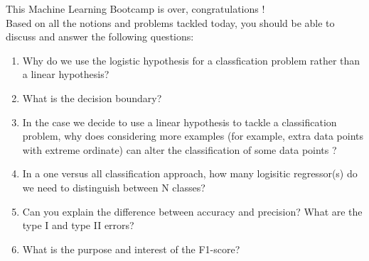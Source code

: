 \documentclass{42-en}
\begin{document}
This Machine Learning Bootcamp is over, congratulations !\\
\newline
Based on all the notions and problems
tackled today, you should be able to discuss and answer the following questions:
\begin{enumerate}
  \item Why do we use the logistic hypothesis for a classfication problem rather than a linear hypothesis?
  \item What is the decision boundary?
  \item In the case we decide to use a linear hypothesis to tackle a classification problem, why does considering more examples
   (for example, extra data points with extreme ordinate) can alter the classification of some data points ?  
  \item In a one versus all classification approach, how many logisitic regressor(s) do we need to distinguish between N classes?
  \item Can you explain the difference between accuracy and precision?\newline
  What are the type I and type II errors?
  \item What is the purpose and interest of the F1-score?
\end{enumerate}

\newpage

\end{document}
